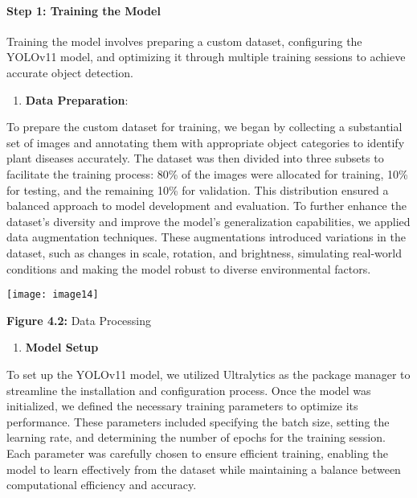 \documentclass{book} %
\begin{document}
\noindent 
\paragraph{Step 1: Training the Model }

\noindent Training the model involves preparing a custom dataset, configuring the YOLOv11 model, and optimizing it through multiple training sessions to achieve accurate object detection.

\begin{enumerate}
\item  \textbf{Data Preparation}:
\end{enumerate}

\noindent      To prepare the custom dataset for training, we began by collecting a substantial set of images and annotating them with appropriate object categories to identify plant diseases accurately. The dataset was then divided into three subsets to facilitate the training process: 80\% of the images were allocated for training, 10\% for testing, and the remaining 10\% for validation. This distribution ensured a balanced approach to model development and evaluation. To further enhance the dataset's diversity and improve the model's generalization capabilities, we applied data augmentation techniques. These augmentations introduced variations in the dataset, such as changes in scale, rotation, and brightness, simulating real-world conditions and making the model robust to diverse environmental factors.

\noindent \texttt{[image: image14]}

\noindent 

\textbf{          Figure 4.2:} Data Processing\textbf{ }

\noindent 

\begin{enumerate}
\item  \textbf{Model Setup}
\end{enumerate}

\noindent      To set up the YOLOv11 model, we utilized Ultralytics as the package manager to streamline the installation and configuration process. Once the model was initialized, we defined the necessary training parameters to optimize its performance. These parameters included specifying the batch size, setting the learning rate, and determining the number of epochs for the training session. Each parameter was carefully chosen to ensure efficient training, enabling the model to learn effectively from the dataset while maintaining a balance between computational efficiency and accuracy.
\end{document}
